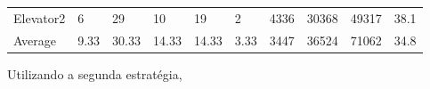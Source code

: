 ﻿\documentclass[a4paper]{article}
\begin{document}
\begin{table}[h]
\begin{tabular}{@{}llllllllll@{}}
Elevator2 & 6        & 29            & 10           & 19                                                               & 2                                                                  & 4336                                                         & 30368                                                 & 49317                                                   & 38.1         \\
Average   & 9.33     & 30.33         & 14.33        & 14.33                                                               & 3.33                                                               & 3447                                                         & 36524                                                 & 71062                                                   & 34.8          \\ \bottomrule
\end{tabular}
\end{table}

Utilizando a segunda estratégia,
\end{document}
